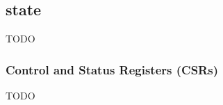 \subsection{\XCRYPTO state}
\label{sec:spec:state}

TODO



\subsubsection{Control and Status Registers (CSRs)}
\label{sec:spec:state:csr}

TODO

